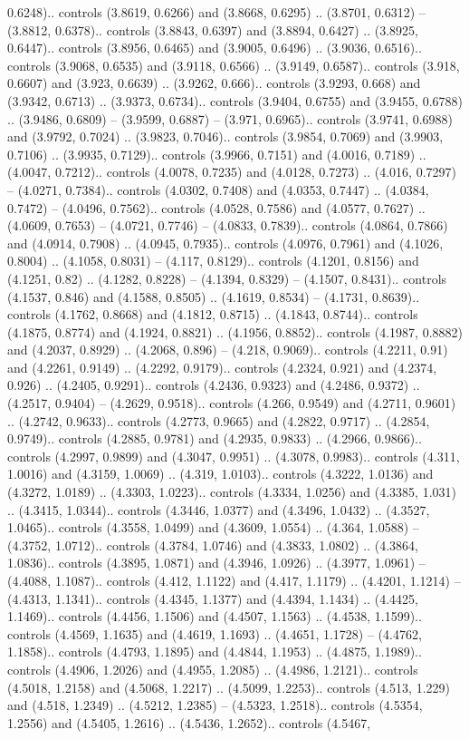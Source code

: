 0.6248).. controls (3.8619, 0.6266) and (3.8668, 0.6295) .. (3.8701, 0.6312) -- (3.8812, 0.6378).. controls (3.8843, 0.6397) and (3.8894, 0.6427) .. (3.8925, 0.6447).. controls (3.8956, 0.6465) and (3.9005, 0.6496) .. (3.9036, 0.6516).. controls (3.9068, 0.6535) and (3.9118, 0.6566) .. (3.9149, 0.6587).. controls (3.918, 0.6607) and (3.923, 0.6639) .. (3.9262, 0.666).. controls (3.9293, 0.668) and (3.9342, 0.6713) .. (3.9373, 0.6734).. controls (3.9404, 0.6755) and (3.9455, 0.6788) .. (3.9486, 0.6809) -- (3.9599, 0.6887) -- (3.971, 0.6965).. controls (3.9741, 0.6988) and (3.9792, 0.7024) .. (3.9823, 0.7046).. controls (3.9854, 0.7069) and (3.9903, 0.7106) .. (3.9935, 0.7129).. controls (3.9966, 0.7151) and (4.0016, 0.7189) .. (4.0047, 0.7212).. controls (4.0078, 0.7235) and (4.0128, 0.7273) .. (4.016, 0.7297) -- (4.0271, 0.7384).. controls (4.0302, 0.7408) and (4.0353, 0.7447) .. (4.0384, 0.7472) -- (4.0496, 0.7562).. controls (4.0528, 0.7586) and (4.0577, 0.7627) .. (4.0609, 0.7653) -- (4.0721, 0.7746) -- (4.0833, 0.7839).. controls (4.0864, 0.7866) and (4.0914, 0.7908) .. (4.0945, 0.7935).. controls (4.0976, 0.7961) and (4.1026, 0.8004) .. (4.1058, 0.8031) -- (4.117, 0.8129).. controls (4.1201, 0.8156) and (4.1251, 0.82) .. (4.1282, 0.8228) -- (4.1394, 0.8329) -- (4.1507, 0.8431).. controls (4.1537, 0.846) and (4.1588, 0.8505) .. (4.1619, 0.8534) -- (4.1731, 0.8639).. controls (4.1762, 0.8668) and (4.1812, 0.8715) .. (4.1843, 0.8744).. controls (4.1875, 0.8774) and (4.1924, 0.8821) .. (4.1956, 0.8852).. controls (4.1987, 0.8882) and (4.2037, 0.8929) .. (4.2068, 0.896) -- (4.218, 0.9069).. controls (4.2211, 0.91) and (4.2261, 0.9149) .. (4.2292, 0.9179).. controls (4.2324, 0.921) and (4.2374, 0.926) .. (4.2405, 0.9291).. controls (4.2436, 0.9323) and (4.2486, 0.9372) .. (4.2517, 0.9404) -- (4.2629, 0.9518).. controls (4.266, 0.9549) and (4.2711, 0.9601) .. (4.2742, 0.9633).. controls (4.2773, 0.9665) and (4.2822, 0.9717) .. (4.2854, 0.9749).. controls (4.2885, 0.9781) and (4.2935, 0.9833) .. (4.2966, 0.9866).. controls (4.2997, 0.9899) and (4.3047, 0.9951) .. (4.3078, 0.9983).. controls (4.311, 1.0016) and (4.3159, 1.0069) .. (4.319, 1.0103).. controls (4.3222, 1.0136) and (4.3272, 1.0189) .. (4.3303, 1.0223).. controls (4.3334, 1.0256) and (4.3385, 1.031) .. (4.3415, 1.0344).. controls (4.3446, 1.0377) and (4.3496, 1.0432) .. (4.3527, 1.0465).. controls (4.3558, 1.0499) and (4.3609, 1.0554) .. (4.364, 1.0588) -- (4.3752, 1.0712).. controls (4.3784, 1.0746) and (4.3833, 1.0802) .. (4.3864, 1.0836).. controls (4.3895, 1.0871) and (4.3946, 1.0926) .. (4.3977, 1.0961) -- (4.4088, 1.1087).. controls (4.412, 1.1122) and (4.417, 1.1179) .. (4.4201, 1.1214) -- (4.4313, 1.1341).. controls (4.4345, 1.1377) and (4.4394, 1.1434) .. (4.4425, 1.1469).. controls (4.4456, 1.1506) and (4.4507, 1.1563) .. (4.4538, 1.1599).. controls (4.4569, 1.1635) and (4.4619, 1.1693) .. (4.4651, 1.1728) -- (4.4762, 1.1858).. controls (4.4793, 1.1895) and (4.4844, 1.1953) .. (4.4875, 1.1989).. controls (4.4906, 1.2026) and (4.4955, 1.2085) .. (4.4986, 1.2121).. controls (4.5018, 1.2158) and (4.5068, 1.2217) .. (4.5099, 1.2253).. controls (4.513, 1.229) and (4.518, 1.2349) .. (4.5212, 1.2385) -- (4.5323, 1.2518).. controls (4.5354, 1.2556) and (4.5405, 1.2616) .. (4.5436, 1.2652).. controls (4.5467, 